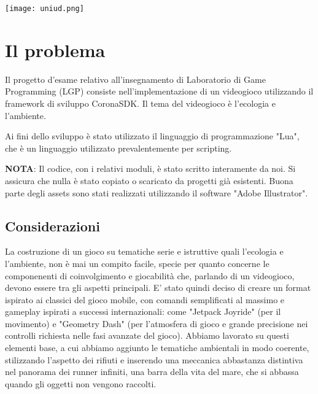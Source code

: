 \documentclass[12pt]{article}
\begin{document}
\begin{titlepage}



\texttt{[image: uniud.png]}\\[1cm] %
 

\vfill %

\end{titlepage}
\tableofcontents
\clearpage
\section{Il problema}
Il progetto d’esame relativo all’insegnamento di Laboratorio di Game Programming (LGP) consiste nell’implementazione di un videogioco utilizzando il framework di sviluppo CoronaSDK. Il tema del videogioco è l'ecologia e l'ambiente. 

Ai fini dello sviluppo è stato utilizzato il linguaggio di programmazione "Lua", che è un linguaggio utilizzato prevalentemente per scripting.


\textbf{NOTA}: Il codice, con i relativi moduli, è stato scritto interamente da noi. Si assicura che nulla è stato copiato o scaricato da progetti già esistenti. Buona parte degli assets sono stati realizzati utilizzando il software "Adobe Illustrator".
\subsection{Considerazioni}
La costruzione di un gioco su tematiche serie e istruttive quali l'ecologia e l'ambiente, non è mai un compito facile, specie per quanto concerne le componenenti di coinvolgimento e giocabilità che, parlando di un videogioco, devono essere tra gli aspetti principali. E' stato quindi deciso di creare un format ispirato ai classici del gioco mobile, con comandi semplificati al massimo e gameplay ispirati a successi internazionali: come "Jetpack Joyride" (per il movimento) e "Geometry Dash" (per l'atmosfera di gioco e grande precisione nei controlli richiesta nelle fasi avanzate del gioco). Abbiamo lavorato su questi elementi base, a cui abbiamo aggiunto le tematiche ambientali in modo coerente, stilizzando l'aspetto dei rifiuti e inserendo una meccanica abbastanza distintiva nel panorama dei runner infiniti, una barra della vita del mare, che si abbassa quando gli oggetti non vengono raccolti.
\end{document}
